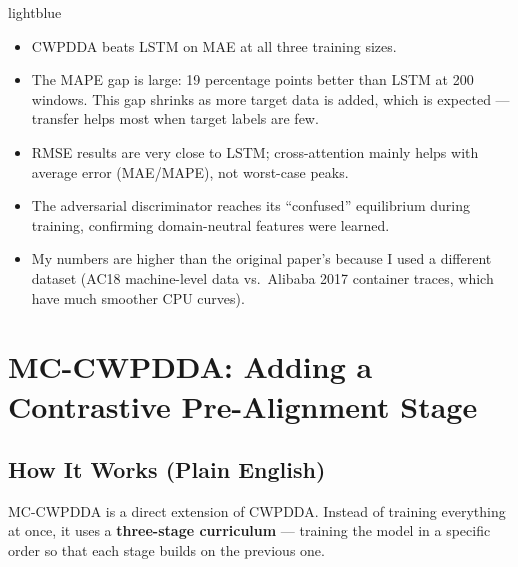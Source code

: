 \documentclass[12pt,a4paper]{article}
\begin{document}
\begin{keybox}{lightblue}
\begin{itemize}[leftmargin=*,noitemsep]
  \item CWPDDA beats LSTM on MAE at all three training sizes.
  \item The MAPE gap is large: 19 percentage points better than LSTM at
        200 windows. This gap shrinks as more target data is added, which is
        expected --- transfer helps most when target labels are few.
  \item RMSE results are very close to LSTM; cross-attention mainly helps
        with average error (MAE/MAPE), not worst-case peaks.
  \item The adversarial discriminator reaches its ``confused'' equilibrium
        during training, confirming domain-neutral features were learned.
  \item My numbers are higher than the original paper's because I used a
        different dataset (AC18 machine-level data vs.\ Alibaba 2017 container
        traces, which have much smoother CPU curves).
\end{itemize}
\end{keybox}

\section{\textcolor{mccolor}{MC-CWPDDA}: Adding a Contrastive Pre-Alignment Stage}
\label{sec:mc_cwpdda}

\subsection{How It Works (Plain English)}

MC-CWPDDA is a direct extension of CWPDDA. Instead of training everything at
once, it uses a \textbf{three-stage curriculum} --- training the model in a
specific order so that each stage builds on the previous one.
\end{document}
